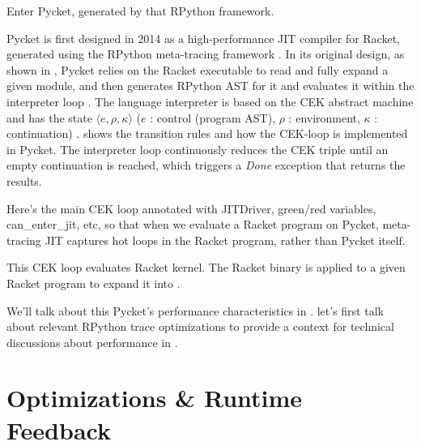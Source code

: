         \begin{paragraph-here}
            Enter Pycket, generated by that RPython framework.

            Pycket is first designed in 2014 as a high-performance JIT compiler
            for Racket, generated using the RPython meta-tracing framework
            \cite{bolz14-racket}. In its original design, as shown in
            , Pycket relies on the Racket executable to
            read and fully expand a given module\cite{samth:11}, and then
            generates RPython AST for it and evaluates it within the interpreter
            loop \cite{pycket15}. The language interpreter is based on the CEK
            abstract machine and has the state $\langle e, \rho, \kappa \rangle$ ($e$ : control
            (program AST), $\rho$ : environment, $\kappa$ : continuation)
            \cite{felleisen87}.  shows the transition rules and
            how the CEK-loop is implemented in Pycket. The interpreter loop
            continuously reduces the CEK triple until an empty continuation is
            reached, which triggers a \emph{Done} exception that returns the
            results.
        \end{paragraph-here}

        \begin{paragraph-here}
            Here's the main CEK loop annotated with JITDriver, green/red variables, can\_enter\_jit, etc, so that when we evaluate a Racket program on Pycket, meta-tracing JIT captures hot loops in the Racket program, rather than Pycket itself.
        \end{paragraph-here}

        \begin{paragraph-here}
            This CEK loop evaluates Racket kernel. The Racket binary is applied to a given Racket program to expand it into .
        \end{paragraph-here}

        \begin{paragraph-here}
            We'll talk about this Pycket's performance characteristics in . let's first talk about relevant RPython trace optimizations to provide a context for technical discussions about performance in .
        \end{paragraph-here}

    \section{Optimizations \& Runtime Feedback}

